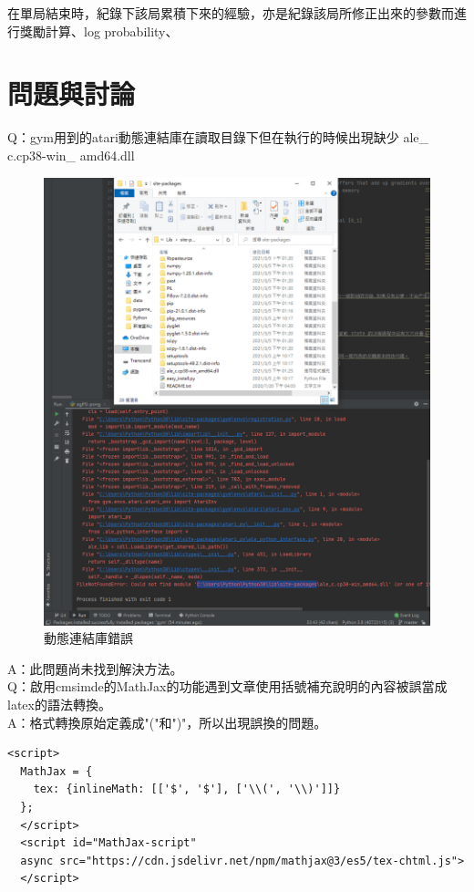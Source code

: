 \documentclass[14pt,a4paper]{report}  %
\begin{document}
 在單局結束時，紀錄下該局累積下來的經驗，亦是紀錄該局所修正出來的參數而進行獎勵計算、log probability、\\

\newpage
\chapter{問題與討論}
Q：gym用到的atari動態連結庫在讀取目錄下但在執行的時候出現缺少 ale\_ c.cp38-win\_ amd64.dll
\begin{figure}[hbt!]
\begin{center}
\includegraphics[width=15cm]{Q_dll}
\caption{動態連結庫錯誤}
\label{fig.動態連結庫錯誤}
\end{center}
\end{figure}

A：此問題尚未找到解決方法。\\
Q：啟用cmsimde的MathJax的功能遇到文章使用括號補充說明的內容被誤當成latex的語法轉換。\\

A：格式轉換原始定義成"("和")"，所以出現誤換的問題。\\
\begin{lstlisting}[caption=MathJax 程式碼]
<script>
  MathJax = {
    tex: {inlineMath: [['$', '$'], ['\\(', '\\)']]}
  };
  </script>
  <script id="MathJax-script" 
  async src="https://cdn.jsdelivr.net/npm/mathjax@3/es5/tex-chtml.js"> 
  </script>
\end{lstlisting}
\end{document}
